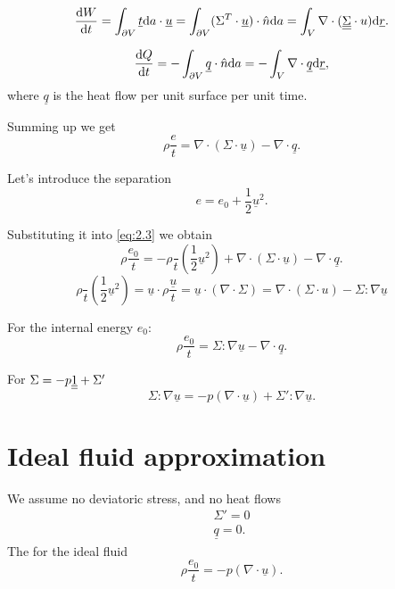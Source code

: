 \documentclass[11pt,oneside]{book}
\renewcommand{\vec}[1]{\underline{#1}}
\theoremstyle{definition} %
\theoremstyle{plain} %
\theoremstyle{remark} %
\theoremstyle{underline}
\begin{document}
  \begin{displaymath}
    \dfrac{W}{t} = \int_{\partial V } \vec t \d a \cdot \vec u 
    = \int_{\partial V} (\Sigma^T \cdot \vec u ) \cdot \hat n  \d a 
    = \int_V \nabla \cdot ( \ul{\ul{\Sigma}} \cdot u) \d \vec r.
  \end{displaymath}

  \begin{displaymath}
    \dfrac{Q}{t} = - \int_{\partial V} \vec q \cdot  \hat n \d a = - \int_V \nabla \cdot \vec q \d \vec r,
  \end{displaymath}
  where $\vec q$ is the heat flow per unit surface per unit time. %

  Summing up we get
  \begin{equation}
    \rho \dfrac{ e}{t} = \nabla \cdot ( \Sigma \cdot \vec u) - \nabla \cdot \vec q.
    \label{eq:2.3}
  \end{equation}

  Let's introduce the separation 
  \begin{displaymath}
    e = e_0 + \frac{1}{2} \vec u^2.
  \end{displaymath}

  Substituting it into \ref{eq:2.3} we obtain
  \begin{displaymath}
    \rho \dfrac{e_0}{t} = - \rho \dfrac{}{t} \left( \frac{1}{2} \vec u^2 \right) + \nabla \cdot (\Sigma \cdot \vec u ) - \nabla \cdot \vec q.
  \end{displaymath}
  \begin{displaymath}
    \rho \dfrac{}{t} \left( \frac{1}{2} \vec u ^2  \right) 
    = \vec u \cdot \rho \dfrac{\vec u}{t} 
    = \vec u \cdot ( \nabla \cdot \Sigma) 
    = \nabla \cdot ( \Sigma \cdot u) - \Sigma :\nabla \vec u %
  \end{displaymath}
  
  For the internal energy $e_0$:
  \begin{displaymath}
    \rho \dfrac{e_0}{t} = \Sigma : \nabla \vec u - \nabla \cdot \vec q.
  \end{displaymath}
  
  For $\Sigma = - p \underline{\underline{1}} + \Sigma'$
  \begin{displaymath}
    \Sigma : \nabla \vec u = - p ( \nabla \cdot \vec u) + \Sigma' : \nabla \vec u.
  \end{displaymath}
  
  \section{Ideal fluid approximation}
  We assume no deviatoric stress, and no heat flows
  \begin{align*}
    \Sigma' = 0 \\
    \vec q = 0.
  \end{align*}
  The for the ideal fluid
  \begin{displaymath}
    \rho \dfrac{e_0}{t} = - p ( \nabla \cdot \vec u).
  \end{displaymath}
\end{document}
